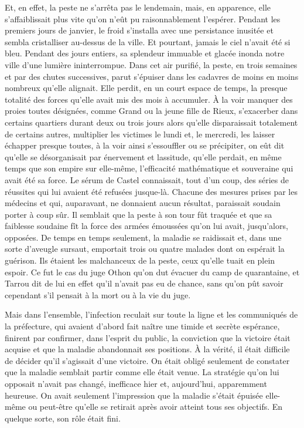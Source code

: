 \documentclass[french,twoside]{book} %
\begin{document}
Et, en effet, la peste ne s’arrêta pas le lendemain, mais, en apparence, elle s’affaiblissait plus vite qu’on n’eût pu raisonnablement l’espérer. Pendant les premiers jours de janvier, le froid s’installa avec une persistance inusitée et sembla cristalliser au-dessus de la ville. Et pourtant, jamais le ciel n’avait été si bleu. Pendant des jours entiers, sa splendeur immuable et glacée inonda notre ville d’une lumière ininterrompue. Dans cet air purifié, la peste, en trois semaines et par des chutes successives, parut s’épuiser dans les cadavres de moins en moins nombreux qu’elle alignait. Elle perdit, en un court espace de temps, la presque totalité des forces qu’elle avait mis des mois à accumuler. À la voir manquer des proies toutes désignées, comme Grand ou la jeune fille de Rieux, s’exacerber dans certains quartiers durant deux ou trois jours alors qu’elle disparaissait totalement de certains autres, multiplier les victimes le lundi et, le mercredi, les laisser échapper presque toutes, à la voir ainsi s’essouffler ou se précipiter, on eût dit qu’elle se désorganisait par énervement et lassitude, qu’elle perdait, en même temps que son empire sur elle-même, l’efficacité mathématique et souveraine qui avait été sa force. Le sérum de Castel connaissait, tout d’un coup, des séries de réussites qui lui avaient été refusées jusque-là. Chacune des mesures prises par les médecins et qui, auparavant, ne donnaient aucun résultat, paraissait soudain porter à coup sûr. Il semblait que la peste à son tour fût traquée et que sa faiblesse soudaine fît la force des armées émoussées qu’on lui avait, jusqu’alors, opposées. De temps en temps seulement, la maladie se raidissait et, dans une sorte d’aveugle sursaut, emportait trois ou quatre malades dont on espérait la guérison. Ils étaient les malchanceux de la peste, ceux qu’elle tuait en plein espoir. Ce fut le cas du juge Othon qu’on dut évacuer du camp de quarantaine, et Tarrou dit de lui en effet qu’il n’avait pas eu de chance, sans qu’on pût savoir cependant s’il pensait à la mort ou à la vie du juge.\par
Mais dans l’ensemble, l’infection reculait sur toute la ligne et les communiqués de la préfecture, qui avaient d’abord fait naître une timide et secrète espérance, finirent par confirmer, dans l’esprit du public, la conviction que la victoire était acquise et que la maladie abandonnait ses positions. À la vérité, il était difficile de décider qu’il s’agissait d’une victoire. On était obligé seulement de constater que la maladie semblait partir comme elle était venue. La stratégie qu’on lui opposait n’avait pas changé, inefficace hier et, aujourd’hui, apparemment heureuse. On avait seulement l’impression que la maladie s’était épuisée elle-même ou peut-être qu’elle se retirait après avoir atteint tous ses objectifs. En quelque sorte, son rôle était fini.\par
\end{document}
